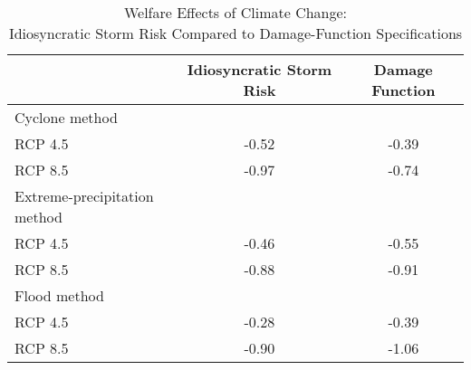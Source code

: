 \begin{table}[H] 
\singlespace 
\center 
\caption{Welfare Effects of Climate Change: \\ Idiosyncratic Storm Risk Compared to Damage-Function Specifications} \label{tab:welfare_ccnr}
\vspace{-.1in} 
\begin{tabular}{l c c}\hline 
\hline 
 	&Idiosyncratic Storm Risk & Damage Function \\ 
\hline 
Cyclone method \\ 
\hspace{1em} RCP 4.5  &    -0.52 &    -0.39   \\\hspace{1em} RCP 8.5 &    -0.97 &    -0.74   \\Extreme-precipitation method \\ 
\hspace{1em} RCP 4.5 &     -0.46 &    -0.55   \\\hspace{1em} RCP 8.5&     -0.88 &    -0.91   \\Flood method \\ 
\hspace{1em} RCP 4.5&    -0.28 &    -0.39   \\\hspace{1em} RCP 8.5 &    -0.90 &    -1.06   \\\hline 
\end{tabular}
\end{table} 
